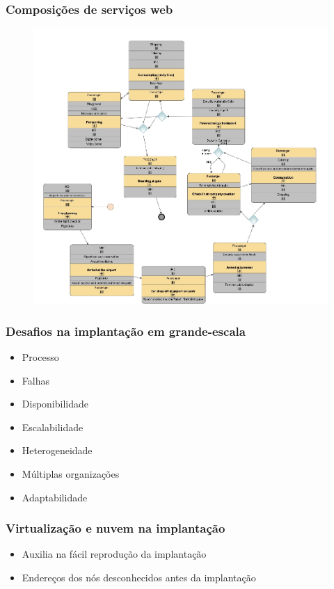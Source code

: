 \documentclass{beamer}
\begin{document}

\begin{frame}
\frametitle{Composições de serviços web}

\begin{figure}
\includegraphics[width=0.7\linewidth]{img/chorwp6}
\end{figure}


\end{frame}


\begin{frame}
\frametitle{Desafios na implantação em grande-escala}

\begin{itemize}
\item Processo
\item Falhas
\item Disponibilidade
\item Escalabilidade
\item Heterogeneidade
\item Múltiplas organizações
\item Adaptabilidade
\end{itemize}

\end{frame}


\begin{frame}
\frametitle{Virtualização e nuvem na implantação}

\begin{itemize}
\item Auxilia na fácil reprodução da implantação 
\item Endereços dos nós desconhecidos antes da implantação
\end{itemize}


\end{frame}
\end{document}
